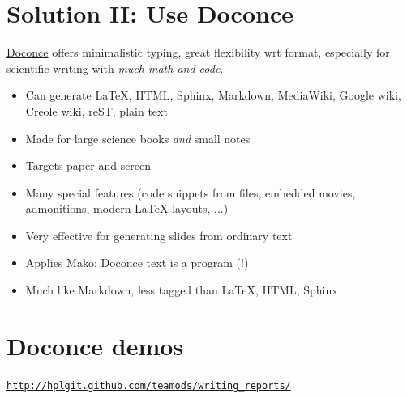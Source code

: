 \documentclass[%
twoside,                 %
final,                   %
chapterprefix=true,      %
open=right               %
10pt]{book}
\newcounter{doconce:movie:counter}
\newcounter{doconce:exercise:counter}
\begin{document}
\noindent
\section*{Solution II: Use Doconce}

\href{{http://hplgit.github.io/doconce/doc/web/index.html}}{Doconce}
offers minimalistic typing, great flexibility wrt format,
especially for scientific writing with \emph{much math and code}.

\begin{itemize}
 \item Can generate {\LaTeX}, HTML, Sphinx, Markdown, MediaWiki, Google wiki,
   Creole wiki, reST, plain text

 \item Made for large science books \emph{and} small notes

 \item Targets paper and screen

 \item Many special features (code snippets from files, embedded movies,
   admonitions, modern {\LaTeX} layouts, ...)

 \item Very effective for generating slides from ordinary text

 \item Applies Mako: Doconce text is a program (!)

 \item Much like Markdown, less tagged than {\LaTeX}, HTML, Sphinx
\end{itemize}

\noindent
\section*{Doconce demos}

\href{{http://hplgit.github.com/teamods/writing_reports/}}{\nolinkurl{http://hplgit.github.com/teamods/writing_reports/}}
\end{document}
